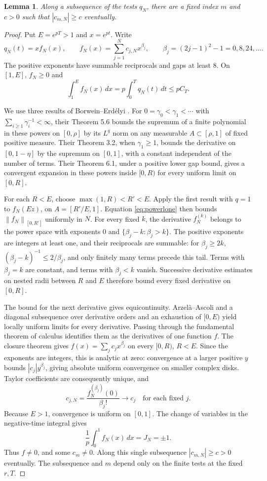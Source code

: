 \documentclass[11pt]{article}
\newtheorem{lemma}[theorem]{Lemma}
\theoremstyle{remark}
\newcommand{\norm}[1]{\left\lVert #1\right\rVert}
\begin{document}
\begin{lemma}\label{lem:coefficient}
Along a subsequence of the tests $q_N$, there are a fixed index $m$ and
$c>0$ such that $|c_{m,N}|\ge c$ eventually.
\end{lemma}
\begin{proof}
Put $E=e^{pT}>1$ and $x=e^{pt}$. Write
\[
 q_N(t)=x f_N(x),\qquad f_N(x)=\sum_{j=1}^N c_{j,N}x^{\beta_j},
 \qquad\beta_j=(2j-1)^2-1=0,8,24,\ldots.
\]
The positive exponents have summable reciprocals and gaps at least $8$.
On $[1,E]$, $f_N\ge0$ and
\begin{equation}\label{eq:powerlone}
 \int_1^Ef_N(x)\,dx=p\int_0^Tq_N(t)\,dt\le pC_T.
\end{equation}

We use three results of Borwein--Erd\'elyi \cite{BE1997}. For
$0=\gamma_0<\gamma_1<\cdots$ with $\sum_{i\ge1}\gamma_i^{-1}<\infty$,
their Theorem 5.6 bounds the supremum of a finite polynomial in these
powers on $[0,\rho]$ by its $L^q$ norm on any measurable
$A\subset[\rho,1]$ of fixed positive measure. Their Theorem 3.2, when
$\gamma_1\ge1$, bounds the derivative on $[0,1-\eta]$ by the supremum
on $[0,1]$, with a constant independent of the number of terms.
Their Theorem 6.1, under a positive lower gap bound, gives a convergent
expansion in these powers inside $[0,R)$ for every uniform limit on $[0,R]$.

For each $R<E$, choose $\max(1,R)<R'<E$. Apply the first result with
$q=1$ to $f_N(Ez)$, on $A=[R'/E,1]$. Equation \eqref{eq:powerlone}
then bounds $\norm{f_N}_{[0,R']}$ uniformly in $N$.
For every fixed $k$, the derivative $f_N^{(k)}$ belongs to the power space
with exponents $0$ and $\{\beta_j-k:\beta_j>k\}$. The positive exponents
are integers at least one, and their reciprocals are summable: for
$\beta_j\ge2k$, $(\beta_j-k)^{-1}\le2/\beta_j$, and only finitely many
terms precede this tail. Terms with $\beta_j=k$ are constant, and terms
with $\beta_j<k$ vanish. Successive derivative estimates on nested radii
between $R$ and $E$ therefore bound every fixed derivative on $[0,R]$.

The bound for the next derivative gives equicontinuity. Arzel\`a--Ascoli
and a diagonal subsequence over derivative orders and an exhaustion of
$[0,E)$ yield locally uniform limits for every derivative. Passing through
the fundamental theorem of calculus identifies them as the derivatives of
one function $f$. The closure theorem gives
$f(x)=\sum_jc_jx^{\beta_j}$ on every $[0,R)$, $R<E$. Since the exponents
are integers, this is analytic at zero: convergence at a larger positive
$y$ bounds $|c_j|y^{\beta_j}$, giving absolute uniform convergence on
smaller complex disks. Taylor coefficients are consequently unique, and
\[
 c_{j,N}=\frac{f_N^{(\beta_j)}(0)}{\beta_j!}\longrightarrow c_j
       \quad\text{for each fixed }j.
\]
Because $E>1$, convergence is uniform on $[0,1]$. The change of variables
in the negative-time integral gives
\[
 \frac1p\int_0^1f_N(x)\,dx=J_N=\pm1.
\]
Thus $f\ne0$, and some $c_m\ne0$. Along this single subsequence
$|c_{m,N}|\ge c>0$ eventually. The subsequence and $m$ depend only on the
finite tests at the fixed $r,T$.
\end{proof}
\end{document}
